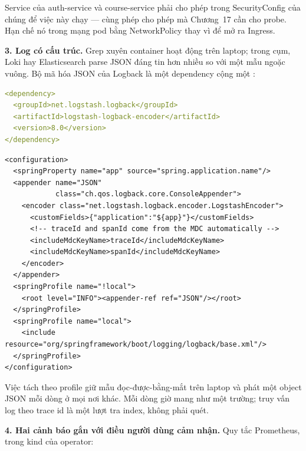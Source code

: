 Service của auth-service và course-service phải cho phép
 trong SecurityConfig của chúng để việc này
chạy --- cùng phép cho phép mà Chương~17 cần cho probe. Hạn chế nó
trong mạng pod bằng NetworkPolicy thay vì để mở ra Ingress.

\textbf{3. Log có cấu trúc.} Grep xuyên container hoạt động trên
laptop; trong cụm, Loki hay Elasticsearch parse JSON đáng tin hơn nhiều
so với một mẫu ngoặc vuông. Bộ mã hóa JSON của Logback là một dependency
cộng một :

\begin{lstlisting}[language=yaml]
<dependency>
  <groupId>net.logstash.logback</groupId>
  <artifactId>logstash-logback-encoder</artifactId>
  <version>8.0</version>
</dependency>
\end{lstlisting}

\begin{lstlisting}
<configuration>
  <springProperty name="app" source="spring.application.name"/>
  <appender name="JSON"
            class="ch.qos.logback.core.ConsoleAppender">
    <encoder class="net.logstash.logback.encoder.LogstashEncoder">
      <customFields>{"application":"${app}"}</customFields>
      <!-- traceId and spanId come from the MDC automatically -->
      <includeMdcKeyName>traceId</includeMdcKeyName>
      <includeMdcKeyName>spanId</includeMdcKeyName>
    </encoder>
  </appender>
  <springProfile name="!local">
    <root level="INFO"><appender-ref ref="JSON"/></root>
  </springProfile>
  <springProfile name="local">
    <include resource="org/springframework/boot/logging/logback/base.xml"/>
  </springProfile>
</configuration>
\end{lstlisting}

Việc tách theo profile giữ mẫu đọc-được-bằng-mắt trên laptop và phát
một object JSON mỗi dòng ở mọi nơi khác. Mỗi dòng giờ mang
 như một trường; truy vấn log theo trace id là một lượt
tra index, không phải quét.

\textbf{4. Hai cảnh báo gắn với điều người dùng cảm nhận.} Quy tắc
Prometheus, trong kind  của operator:


